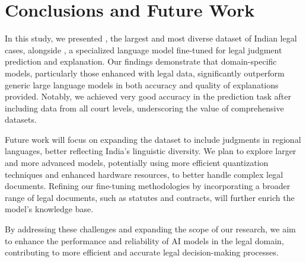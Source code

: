 \section{Conclusions and Future Work}
In this study, we presented \texttt{\named}, the largest and most diverse dataset of Indian legal cases, alongside \texttt{\namel}, a specialized language model fine-tuned for legal judgment prediction and explanation. Our findings demonstrate that domain-specific models, particularly those enhanced with legal data, significantly outperform generic large language models in both accuracy and quality of explanations provided. Notably, we achieved very good accuracy in the prediction task after including data from all court levels, underscoring the value of comprehensive datasets.

% 
Future work will focus on expanding the dataset to include judgments in regional languages, better reflecting India's linguistic diversity. We plan to explore larger and more advanced models, potentially using more efficient quantization techniques and enhanced hardware resources, to better handle complex legal documents. Refining our fine-tuning methodologies by incorporating a broader range of legal documents, such as statutes and contracts, will further enrich the model's knowledge base.

By addressing these challenges and expanding the scope of our research, we aim to enhance the performance and reliability of AI models in the legal domain, contributing to more efficient and accurate legal decision-making processes.

